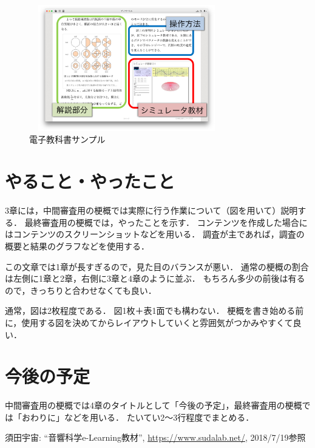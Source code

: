 \documentclass[twocolumn,10pt,a4j]{ltjsarticle}
\begin{document}
\begin{figure}[h]
\begin{center}
 \includegraphics[clip,width=85mm,height=55mm]{textbook.pdf}
\end{center}
 \caption{電子教科書サンプル}
 \label{fig:教科書}
\end{figure}

\section{やること・やったこと}

3章には，中間審査用の梗概では実際に行う作業について（図を用いて）説明する．
最終審査用の梗概では，やったことを示す．
コンテンツを作成した場合にはコンテンツのスクリーンショットなどを用いる．
調査が主であれば，調査の概要と結果のグラフなどを使用する．

この文章では1章が長すぎるので，見た目のバランスが悪い．
通常の梗概の割合は左側に1章と2章，右側に3章と4章のように並ぶ．
もちろん多少の前後は有るので，きっちりと合わせなくても良い．

通常，図は2枚程度である．
図1枚＋表1面でも構わない．
梗概を書き始める前に，使用する図を決めてからレイアウトしていくと雰囲気がつかみやすくて良い．




\section{今後の予定}
中間審査用の梗概では4章のタイトルとして「今後の予定」，最終審査用の梗概では「おわりに」などを用いる．
たいてい2〜3行程度でまとめる．

\begin{thebibliography}{99}
 須田宇宙: ``音響科学e-Learning教材'', \url{https://www.sudalab.net/}, 2018/7/19参照
\end{thebibliography}
\end{document}
